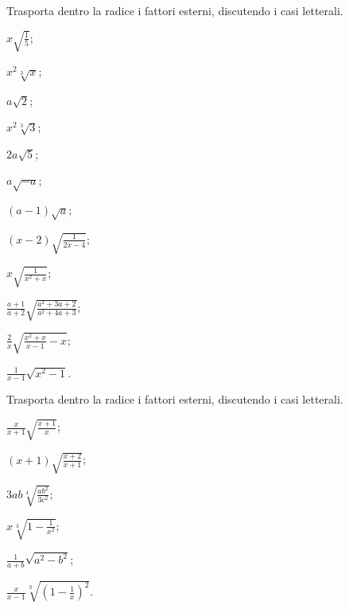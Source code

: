 \begin{esercizio}[\Ast]
 \label{ese:2.49}
Trasporta dentro la radice i fattori esterni, discutendo i casi letterali.
 \begin{multicols}{3}
 \begin{enumeratea}
 \item $x\sqrt{\frac 1 5}$;
 \item $x^2\sqrt[3]x$;
 \item $a\sqrt 2$;
 \item $x^2\sqrt[3]3$;
 \item $2a\sqrt 5$;
 \item $a\sqrt{-a}$;
 \item $(a-1)\sqrt a$;
 \item $(x-2)\sqrt{\frac 1{2x-4}}$;
 \item $x\sqrt{\frac 1{x^2+x}}$;
 \item $\frac{a+1}{a+2}\sqrt{\frac{a^2+3a+2}{a^2+4a+3}}$;
 \item $\frac 2 x\sqrt{\frac{x^2+x}{x-1}-x}$;
 \item $\frac 1{x-1}\sqrt{x^2-1}$.
 \end{enumeratea}
 \end{multicols}
\end{esercizio}
\pagebreak
\begin{esercizio}[\Ast]
 \label{ese:2.50}
Trasporta dentro la radice i fattori esterni, discutendo i casi letterali.
 \begin{multicols}{3}
 \begin{enumeratea}
 \item $\frac{x}{x+1}\sqrt{\frac{x+1}{x}}$;
 \item $(x+1)\sqrt{\frac{x+2}{x+1}}$;
 \item $3ab\sqrt[4]{\frac{ab^2}{3c^2}}$;
 \item $x\sqrt[3]{1-\frac{1}{x^2}}$;
 \item $\frac{1}{a+b}\sqrt{a^2-b^2}$;
 \item $\frac{x}{x-1}\sqrt[3]{\left(1-\frac{1}{x}\right)^2}$.
 \end{enumeratea}
 \end{multicols}
\end{esercizio}

